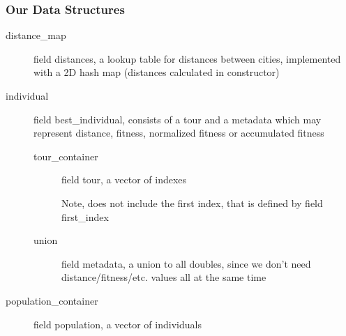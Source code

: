 \documentclass[aspectratio=169,10pt,compress]{beamer}
\begin{document}
\begin{frame}
  \frametitle{Our Data Structures}

  \begin{description}
    \item[\ttfamily distance\_map] field {\ttfamily distances}, a lookup table
      for distances between cities, implemented with a 2D hash map (distances
      calculated in constructor)
    \vspace{1em}
    \item[\ttfamily individual] field {\ttfamily best\_individual}, consists of
      a tour and a metadata which may represent distance, fitness, normalized
      fitness or accumulated fitness
      \begin{description}
        \item[\ttfamily tour\_container] field {\ttfamily tour}, a vector of
          indexes

          Note, does not include the first index, that is defined by field
          {\ttfamily first\_index}
        \item[\ttfamily union] field {\ttfamily metadata},
          a union to all doubles, since we don't need
          distance/fitness/etc. values all at the same time
      \end{description}
    \vspace{1em}
    \item[\ttfamily population\_container] field {\ttfamily population}, a
      vector of individuals
  \end{description}
\end{frame}
\end{document}
